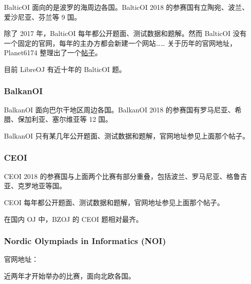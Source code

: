 BalticOI 面向的是波罗的海周边各国。BalticOI 2018 的参赛国有立陶宛、波兰、爱沙尼亚、芬兰等 9 国。

除了 2017 年，BalticOI 每年都公开题面、测试数据和题解。然而 BalticOI 没有一个固定的官网，每年的主办方都会新建一个网站…… 关于历年的官网地址，Planet6174 整理出了一个\href{https://loj.ac/article/416}{帖子}。

目前 LibreOJ 有近十年的 BalticOI 题。

\subsubsection{BalkanOI}

BalkanOI 面向巴尔干地区周边各国。BalkanOI 2018 的参赛国有罗马尼亚、希腊、保加利亚、塞尔维亚等 12 国。

BalkanOI 只有某几年公开题面、测试数据和题解，官网地址参见上面那个帖子。

\subsubsection{CEOI}

CEOI 2018 的参赛国与上面两个比赛有部分重叠，包括波兰、罗马尼亚、格鲁吉亚、克罗地亚等国。

CEOI 每年都公开题面、测试数据和题解，官网地址参见上面那个帖子。

在国内 OJ 中，BZOJ 的 CEOI 题相对最齐。

\subsubsection{Nordic Olympiads in Informatics (NOI)}

官网地址：\href{http://nordic.progolymp.se}{}

近两年才开始举办的比赛，面向北欧各国。
